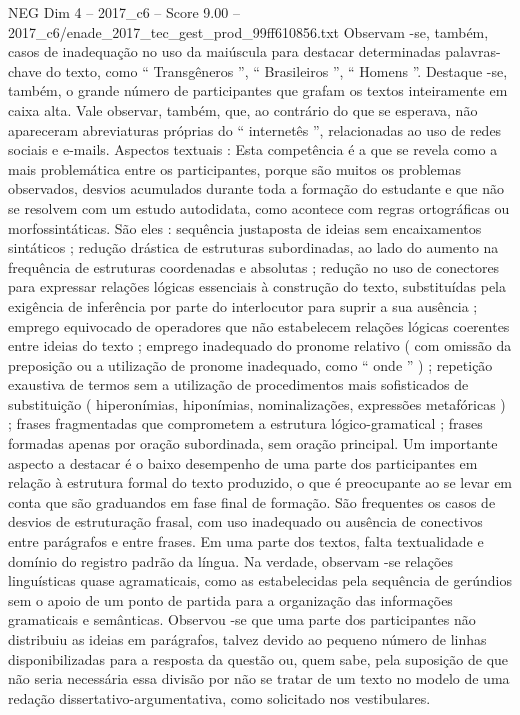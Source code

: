 \begin{textsample}{NEG Dim 4 – 2017\_c6 – Score 9.00 – 2017\_c6/enade\_2017\_tec\_gest\_prod\_99ff610856.txt}
Observam -se, também, casos de inadequação no uso da maiúscula para destacar determinadas palavras-chave do texto, como “ Transgêneros ”, “ Brasileiros ”, “ Homens ”.
Destaque -se, também, o grande número de participantes que grafam os textos inteiramente em caixa alta.
Vale observar, também, que, ao contrário do que se esperava, não apareceram abreviaturas próprias do “ internetês ”, relacionadas ao uso de redes sociais e e-mails.
Aspectos textuais : Esta competência é a que se revela como a mais problemática entre os participantes, porque são muitos os problemas observados, desvios acumulados durante toda a formação do estudante e que não se resolvem com um estudo autodidata, como acontece com regras ortográficas ou morfossintáticas.
São eles : sequência justaposta de ideias sem encaixamentos sintáticos ; redução drástica de estruturas subordinadas, ao lado do aumento na frequência de estruturas coordenadas e absolutas ; redução no uso de conectores para expressar relações lógicas essenciais à construção do texto, substituídas pela exigência de inferência por parte do interlocutor para suprir a sua ausência ; emprego equivocado de operadores que não estabelecem relações lógicas coerentes entre ideias do texto ; emprego inadequado do pronome relativo ( com omissão da preposição ou a utilização de pronome inadequado, como “ onde ” ) ; repetição exaustiva de termos sem a utilização de procedimentos mais sofisticados de substituição ( hiperonímias, hiponímias, nominalizações, expressões metafóricas ) ; frases fragmentadas que comprometem a estrutura lógico-gramatical ; frases formadas apenas por oração subordinada, sem oração principal.
Um importante aspecto a destacar é o baixo desempenho de uma parte dos participantes em relação à estrutura formal do texto produzido, o que é preocupante ao se levar em conta que são graduandos em fase final de formação.
São frequentes os casos de desvios de estruturação frasal, com uso inadequado ou ausência de conectivos entre parágrafos e entre frases.
Em uma parte dos textos, falta textualidade e domínio do registro padrão da língua.
Na verdade, observam -se relações linguísticas quase agramaticais, como as estabelecidas pela sequência de gerúndios sem o apoio de um ponto de partida para a organização das informações gramaticais e semânticas.
Observou -se que uma parte dos participantes não distribuiu as ideias em parágrafos, talvez devido ao pequeno número de linhas disponibilizadas para a resposta da questão ou, quem sabe, pela suposição de que não seria necessária essa divisão por não se tratar de um texto no modelo de uma redação dissertativo-argumentativa, como solicitado nos vestibulares.

\end{textsample}
